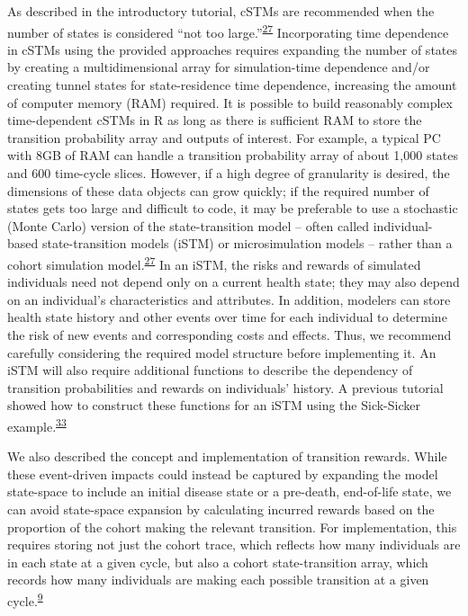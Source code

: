 \documentclass[
]{article}
\begin{document}
As described in the introductory tutorial, cSTMs are recommended when the number of states is considered ``not too large.''\textsuperscript{\protect\hyperlink{ref-Siebert2012c}{27}} Incorporating time dependence in cSTMs using the provided approaches requires expanding the number of states by creating a multidimensional array for simulation-time dependence and/or creating tunnel states for state-residence time dependence, increasing the amount of computer memory (RAM) required. It is possible to build reasonably complex time-dependent cSTMs in R as long as there is sufficient RAM to store the transition probability array and outputs of interest. For example, a typical PC with 8GB of RAM can handle a transition probability array of about 1,000 states and 600 time-cycle slices. However, if a high degree of granularity is desired, the dimensions of these data objects can grow quickly; if the required number of states gets too large and difficult to code, it may be preferable to use a stochastic (Monte Carlo) version of the state-transition model -- often called individual-based state-transition models (iSTM) or microsimulation models -- rather than a cohort simulation model.\textsuperscript{\protect\hyperlink{ref-Siebert2012c}{27}} In an iSTM, the risks and rewards of simulated individuals need not depend only on a current health state; they may also depend on an individual's characteristics and attributes. In addition, modelers can store health state history and other events over time for each individual to determine the risk of new events and corresponding costs and effects. Thus, we recommend carefully considering the required model structure before implementing it. An iSTM will also require additional functions to describe the dependency of transition probabilities and rewards on individuals' history. A previous tutorial showed how to construct these functions for an iSTM using the Sick-Sicker example.\textsuperscript{\protect\hyperlink{ref-Krijkamp2018}{33}}

We also described the concept and implementation of transition rewards. While these event-driven impacts could instead be captured by expanding the model state-space to include an initial disease state or a pre-death, end-of-life state, we can avoid state-space expansion by calculating incurred rewards based on the proportion of the cohort making the relevant transition. For implementation, this requires storing not just the cohort trace, which reflects how many individuals are in each state at a given cycle, but also a cohort state-transition array, which records how many individuals are making each possible transition at a given cycle.\textsuperscript{\protect\hyperlink{ref-Krijkamp2019}{9}}
\end{document}
